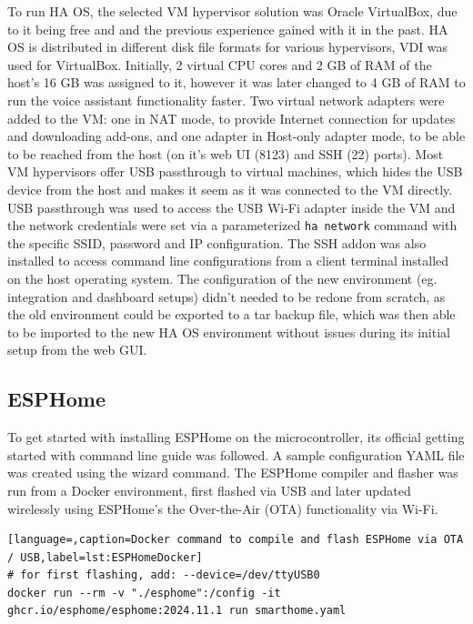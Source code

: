 To run HA OS, the selected VM hypervisor solution was Oracle VirtualBox, due to it being free and and the previous experience gained with it in the past. HA OS is distributed in different disk file formats for various hypervisors, VDI was used for VirtualBox.
Initially, 2 virtual CPU cores and 2 GB of RAM of the host's 16 GB was assigned to it, however it was later changed to 4 GB of RAM to run the voice assistant functionality faster. Two virtual network adapters were added to the VM: one in NAT mode, to provide Internet connection for updates and downloading add-ons, and one adapter in Host-only adapter mode, to be able to be reached from the host (on it's web UI (8123) and SSH (22) ports). Most VM hypervisors offer USB passthrough to virtual machines, which hides the USB device from the host and makes it seem as it was connected to the VM directly. USB passthrough was used to access the USB Wi-Fi adapter inside the VM and the network credentials were set via a parameterized \verb+ha network+ command with the specific SSID, password and IP configuration. The SSH addon was also installed to access command line configurations from a client terminal installed on the host operating system. The configuration of the new environment (eg. integration and dashboard setups) didn't needed to be redone from scratch, as the old environment could be exported to a tar backup file, which was then able to be imported to the new HA OS environment without issues during its initial setup from the web GUI.

\subsection{ESPHome}

To get started with installing ESPHome on the microcontroller, its official getting started with command line guide was followed. \cite{ESPHomeGettingStarted} A sample configuration YAML file was created using the wizard command. The ESPHome compiler and flasher was run from a Docker environment, first flashed via USB and later updated wirelessly using ESPHome's the Over-the-Air (OTA) functionality via Wi-Fi.

\begin{lstlisting}[language=,caption=Docker command to compile and flash ESPHome via OTA / USB,label=lst:ESPHomeDocker]
# for first flashing, add: --device=/dev/ttyUSB0
docker run --rm -v "./esphome":/config -it ghcr.io/esphome/esphome:2024.11.1 run smarthome.yaml
\end{lstlisting}

